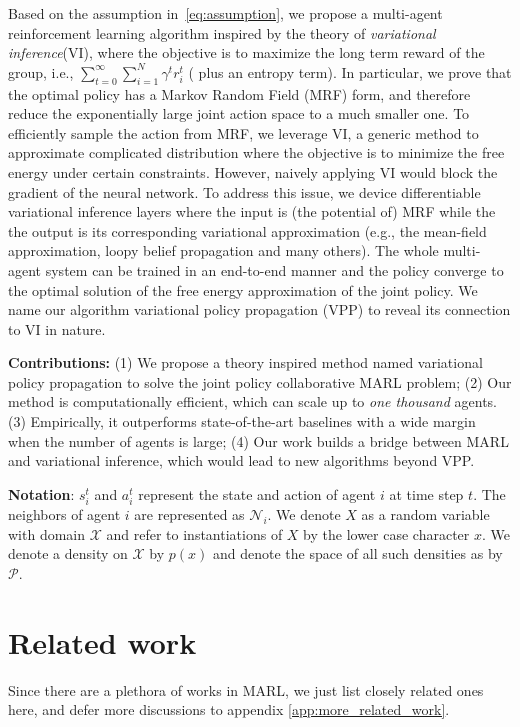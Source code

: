 \documentclass[11pt,a4paper]{article}
\theoremstyle{definition}
\begin{document}
Based on the assumption in~\eqref{eq:assumption}, we propose a  multi-agent reinforcement learning algorithm inspired by the theory of \emph{variational inference}(VI), where the objective is to maximize the long term reward of the group, i.e., $\sum_{t=0}^{\infty} \sum_{i=1}^{N} \gamma^t r^t_i$ ( plus an entropy term). In particular, we prove that the optimal policy has a Markov Random Field (MRF) form, and therefore reduce the exponentially large joint action space to a much smaller one.  To efficiently sample the action from MRF, we leverage VI, a generic method to approximate complicated distribution \cite{bishop2006pattern} where the objective is to minimize the free energy under certain constraints. However, naively applying VI would block the gradient of the neural network. To address this issue, we device differentiable variational inference layers where the input is (the potential of) MRF while the the output is its corresponding variational approximation (e.g., the mean-field approximation, loopy belief propagation and many others).   The whole multi-agent system can be trained in an end-to-end manner and the policy converge to the optimal solution of the free energy approximation of the joint policy.  We name our algorithm variational policy propagation (VPP) to reveal its connection to VI in nature.


\textbf{Contributions:}  
(1) We propose a theory inspired method named variational policy propagation to solve the joint policy collaborative MARL problem; 
(2) Our method is computationally efficient, which can scale up to \emph{one thousand} agents.
(3) Empirically, it outperforms  state-of-the-art baselines with a wide margin when the number of agents is large;
(4) Our work builds a bridge between MARL and variational inference, which would lead to new algorithms beyond VPP.

\textbf{Notation}:  $s_i^t$ and $a_i^t$ represent the state and action of agent $i$ at time step $t$. The neighbors of  agent $i $  are represented as  $ \mathcal{N}_i$.  We denote $X$ as a random variable with domain $\mathcal{X}$ and refer to instantiations of $X$ by the lower case character $x$. We denote  a density on $\mathcal{X}$ by $p(x)$ and denote the space of all such densities as by $\mathcal{P}$.


\section{Related work}
\vspace{-2mm}
Since there are a plethora of works in MARL, we just list closely related ones here, and defer more discussions to appendix \ref{app:more_related_work}. 
\end{document}
